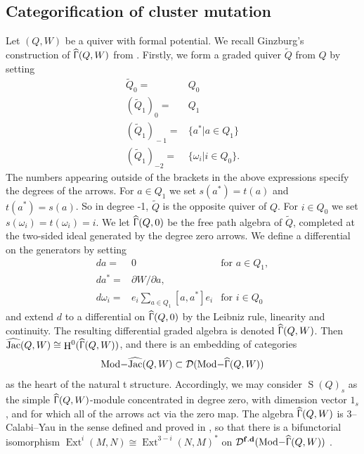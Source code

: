 \documentclass[a4paper,10pt]{amsart}
\DeclareMathOperator{\Simp}{S}
\renewcommand{\Gamma}{\Upgamma}
\DeclareMathOperator{\Ext}{Ext}
\DeclareMathOperator{\fd}{\mathbf{f.d}}
\DeclareMathOperator{\Tmod}{Mod-}
\newcommand{\Rmod}[1]{\Tmod\!#1}
\DeclareMathOperator{\HJac}{\widehat{Jac}}
\DeclareMathOperator{\HGamma}{\widehat{\Gamma}}
\DeclareMathOperator{\HO}{H}
\newcommand{\Dub}{\mathcal{D}}
\begin{document}
\subsection{Categorification of cluster mutation}
Let $(Q,W)$ be a quiver with formal potential.  We recall Ginzburg's construction of $\HGamma(Q,W)$ from \cite{ginz}.  Firstly, we form a graded quiver $\tilde{Q}$ from $Q$ by setting 
\begin{align*}
\tilde{Q}_0=&Q_0\\
(\tilde{Q}_1)_0=&Q_1\\
(\tilde{Q}_1)_{{}-1}=&\{a^*|a\in Q_1\}\\
(\tilde{Q}_1)_{-2}=&\{\omega_i|i\in Q_0\}.
\end{align*}
The numbers appearing outside of the brackets in the above expressions specify the degrees of the arrows.  For $a\in Q_1$ we set $s(a^*)=t(a)$ and $t(a^*)=s(a)$.  So in degree -1, $\tilde{Q}$ is the opposite quiver of $Q$.  For $i\in Q_0$ we set $s(\omega_{i})=t(\omega_i)=i$.  We let $\HGamma(Q,0)$ be the free path algebra of $\tilde{Q}$, completed at the two-sided ideal generated by the degree zero arrows.  We define a differential on the generators by setting
\begin{align*}
da=&0&\textrm{for }a\in Q_1,\\
da^*=&\partial W/\partial a, \\
d\omega_i=&e_i\sum_{a\in Q_1}[a,a^*]e_i&\textrm{for }i\in Q_0
\end{align*}
and extend $d$ to a differential on $\HGamma(Q,0)$ by the Leibniz rule, linearity and continuity.  The resulting differential graded algebra is denoted $\HGamma(Q,W)$.  Then $\HJac(Q,W)\cong\HO^0(\HGamma(Q,W))$, and there is an embedding of categories 
\[
\Rmod{\HJac(Q,W)}\subset \Dub(\Rmod{\HGamma(Q,W)})
\]
as the heart of the natural t structure.  Accordingly, we may consider $\Simp(Q)_{s}$ as the simple $\HGamma(Q,W)$-module concentrated in degree zero, with dimension vector $1_s$, and for which all of the arrows act via the zero map.  The algebra $\HGamma(Q,W)$ is 3--Calabi--Yau in the sense defined and proved in \cite{Kel09}, so that there is a bifunctorial isomorphism $\Ext^i(M,N)\cong \Ext^{3-i}(N,M)^*$ on $\Dub^{\fd}(\Rmod{\HGamma(Q,W)})$ \cite[Lem.4.1]{CYTC}.
\end{document}
